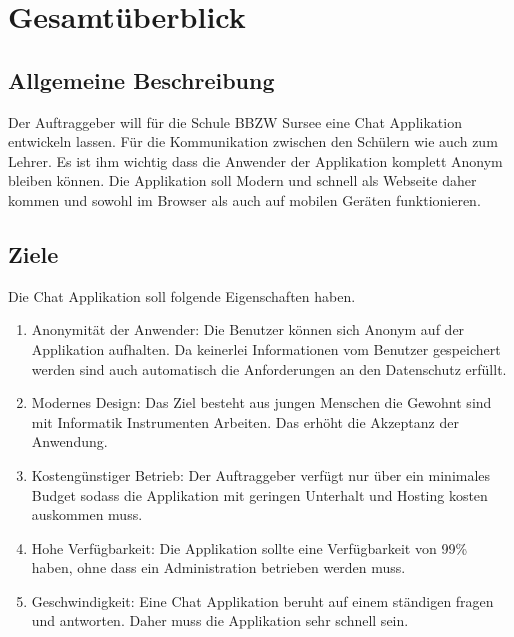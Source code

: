 \documentclass[12pt]{article}
\begin{document}
  \newpage
  \tableofcontents
  \newpage



  \section{Gesamtüberblick}
    \subsection{Allgemeine Beschreibung}
      Der Auftraggeber will für die Schule BBZW Sursee eine Chat Applikation entwickeln lassen.
      Für die Kommunikation zwischen den Schülern wie auch zum Lehrer. Es ist ihm wichtig dass
      die Anwender der Applikation komplett Anonym bleiben können. Die Applikation soll
      Modern und schnell als Webseite daher kommen und sowohl im Browser als auch
      auf mobilen Geräten funktionieren.

    \subsection{Ziele}
      Die Chat Applikation soll folgende Eigenschaften haben.

      \begin{enumerate}
        \item Anonymität der Anwender: Die Benutzer können sich Anonym auf der Applikation aufhalten.
          Da keinerlei Informationen vom Benutzer gespeichert werden sind auch automatisch
          die Anforderungen an den Datenschutz erfüllt.
        \item Modernes Design: Das Ziel besteht aus jungen Menschen die Gewohnt sind mit
          Informatik Instrumenten Arbeiten. Das erhöht die Akzeptanz der Anwendung.
        \item Kostengünstiger Betrieb: Der Auftraggeber verfügt nur über ein minimales Budget
          sodass die Applikation mit geringen Unterhalt und Hosting kosten auskommen muss.
        \item Hohe Verfügbarkeit: Die Applikation sollte eine Verfügbarkeit von 99\% haben,
          ohne dass ein Administration betrieben werden muss.
        \item Geschwindigkeit: Eine Chat Applikation beruht auf einem ständigen fragen und antworten. \newline
          Daher muss die Applikation sehr schnell sein.
      \end{enumerate}
\end{document}
